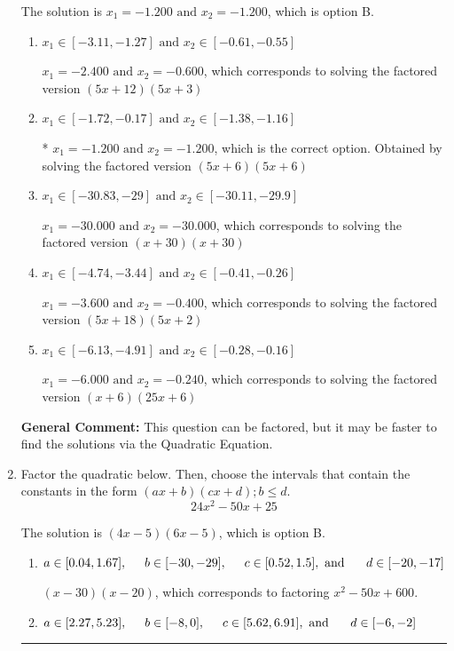 \documentclass{extbook}[14pt]
\newcommand{\litem}[1]{\item #1

\rule{\textwidth}{0.4pt}}
\begin{document}
\begin{enumerate}
{The solution is \( x_1 = -1.200 \text{ and } x_2 = -1.200 \), which is option B.\begin{enumerate}[label=\Alph*.]
\item \( x_1 \in [-3.11, -1.27] \text{ and } x_2 \in [-0.61, -0.55] \)

$x_1 = -2.400 \text{ and } x_2 = -0.600$, which corresponds to solving the factored version $(5x + 12)(5x + 3)$
\item \( x_1 \in [-1.72, -0.17] \text{ and } x_2 \in [-1.38, -1.16] \)

* $x_1 = -1.200 \text{ and } x_2 = -1.200$, which is the correct option. Obtained by solving the factored version $(5x + 6)(5x + 6)$
\item \( x_1 \in [-30.83, -29] \text{ and } x_2 \in [-30.11, -29.9] \)

$x_1 = -30.000 \text{ and } x_2 = -30.000$, which corresponds to solving the factored version $(x + 30)(x + 30)$
\item \( x_1 \in [-4.74, -3.44] \text{ and } x_2 \in [-0.41, -0.26] \)

$x_1 = -3.600 \text{ and } x_2 = -0.400$, which corresponds to solving the factored version $(5x + 18)(5x + 2)$
\item \( x_1 \in [-6.13, -4.91] \text{ and } x_2 \in [-0.28, -0.16] \)

$x_1 = -6.000 \text{ and } x_2 = -0.240$, which corresponds to solving the factored version $(x + 6)(25x + 6)$
\end{enumerate}

\textbf{General Comment:} This question can be factored, but it may be faster to find the solutions via the Quadratic Equation.
}
\litem{
Factor the quadratic below. Then, choose the intervals that contain the constants in the form $(ax+b)(cx+d); b \leq d.$
\[ 24x^{2} -50 x + 25 \]

The solution is \( (4x -5)(6x -5) \), which is option B.\begin{enumerate}[label=\Alph*.]
\item \( a \in [0.04, 1.67], \hspace*{5mm} b \in [-30, -29], \hspace*{5mm} c \in [0.52, 1.5], \text{ and } \hspace*{5mm} d \in [-20, -17] \)

 $(x -30)(x -20)$, which corresponds to factoring $x^{2} -50 x + 600$.
\item \( a \in [2.27, 5.23], \hspace*{5mm} b \in [-8, 0], \hspace*{5mm} c \in [5.62, 6.91], \text{ and } \hspace*{5mm} d \in [-6, -2] \)


\end{enumerate}}
\end{enumerate}
\end{document}
